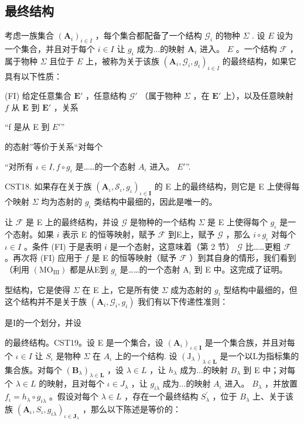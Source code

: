 \subsection{最终结构}

考虑一族集合 \((\mathbf{A}_{i})_{i\in I}\) ，每个集合都配备了一个结构 \(\mathcal{G}_i\) 的物种 \(\Sigma\) . 设 \(E\) 设为一个集合，并且对于每个 \(i\in I\) 让 \(g_i\) 成为...的映射 \(\mathbf{A}_i\) 进入。 \(E\) 。一个结构 \(\mathcal{F}\) ，属于物种 \(\Sigma\) 且位于 \(E\) 上，被称为关于该族 \((\mathbf{A}_i,\mathcal{G}_i,g_i)_{i\in I}\) 的最终结构，如果它具有以下性质：

(FI) 给定任意集合 \(\mathbf{E}'\) ，任意结构 \(\mathcal{G}'\) （属于物种 \(\Sigma\) ，在 \(\mathbf{E}'\) 上），以及任意映射 \(f\) 从 \(\mathbf{E}\) 到 \(\mathbf{E}'\) ，关系

“f 是从 E 到 \(E'\)''

的态射”等价于关系“对每个

``对所有 \(\iota\in I,f\circ g_{\iota}\) 是……的一个态射 \(A_{\iota}\) 进入。 \(E'\)''.

CST18. 如果存在关于族 \((\mathbf{A}_{\iota}, \mathcal{S}_{\iota}, g_{\iota})_{\iota \in \mathbf{I}}\) 的 E 上的最终结构，则它是 E 上使得每个映射 \(\Sigma\) 均为态射的 \(g_{\iota}\) 类结构中最细的，因此是唯一的。

让 \(\mathcal{F}\) 是 E 上的最终结构，并设 \(\mathcal{G}\) 是物种的一个结构 \(\Sigma\) 是 E 上使得每个 \(g_{\iota}\) 是一个态射。如果 \(i\) 表示 E 的恒等映射，赋予 \(\mathcal{F}\) 到E上，赋予 \(\mathcal{G}\) ，那么 \(i \circ g_{\iota}\) 对每个 \(\iota \in I\) 。条件 (FI) 于是表明 \(i\) 是一个态射，这意味着（第 2 节） \(\mathcal{G}\) 比……更粗 \(\mathcal{F}\) 。再次将 (FI) 应用于 \(f\) 是 E 的恒等映射（赋予 \(\mathcal{F}\) ）到其自身的情形，我们看到（利用 \((\mathrm{MO}_{\mathrm{III}})\) 都是从E到 \(g_{\iota}\) 是……的一个态射 \(\mathrm{A}_{\iota}\) 到 E 中。这完成了证明。

型结构，它是使得 \(\Sigma\) 在 E 上，它是所有使 \(\Sigma\) 成为态射的 \(g_{i}\) 型结构中最细的，但这个结构并不是关于族 \((\mathbf{A}_{i},\mathcal{G}_{i},g_{i})\) 我们有以下传递性准则：

是I的一个划分，并设

的最终结构。CST19。设 E 是一个集合，设 \((\mathbf{A}_{\iota})_{\iota\in\mathbf{I}}\) 是一个集合族，并且对每个 \(\iota\in I\) 让 \(S_{\iota}\) 是物种 \(\Sigma\) 在 \(A_{\iota}\) 上的一个结构. 设 \((\mathrm{J}_{\lambda})_{\lambda\in\mathbf{L}}\) 是一个以L为指标集的集合族。对每个 \((\mathbf{B}_{\lambda})_{\lambda\in\mathbf{L}}\) ，设 \(\lambda\in L\) ，让 \(h_{\lambda}\) 成为...的映射 \(B_{\lambda}\) 到 E 中；对每个 \(\lambda\in L\) 的映射，且对每个 \(\iota\in J_{\lambda}\) ，让 \(g_{i\lambda}\) 成为...的映射 \(A_{\iota}\) 进入。 \(B_{\lambda}\) ，并放置 \(f_{\iota}=h_{\lambda}\circ g_{i\lambda}\) 。假设对每个 \(\lambda\in L\) ，存在一个最终结构 \(S_{\lambda}^{\prime}\) ，位于 \(B_{\lambda}\) 上、关于该族 \((\mathbf{A}_{\iota},S_{\iota},g_{i\lambda})_{\iota\in\mathbf{J}_{\lambda}}\) ，那么以下陈述是等价的：

